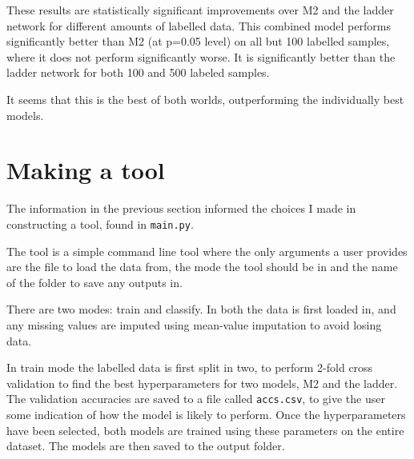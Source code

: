 These results are statistically significant improvements over M2 and the ladder network for different amounts of labelled data.
This combined model performs significantly better than M2 (at p=0.05 level) on all but 100 labelled samples, where it does not 
perform significantly worse. It is significantly better than the ladder network for both 100 and 500 labeled samples. 

It seems that this is the best of both worlds, outperforming the individually best models.

\section{Making a tool} \label{tool}

The information in the previous section informed the choices I made in constructing a tool, found in \texttt{main.py}.

The tool is a simple command line tool where the  only arguments a user provides are the file to load the data 
from, the mode the tool should be in and the name of the folder to save any outputs in.

There are two modes: train and classify. In both the data is first loaded in, and  any missing values are imputed using 
mean-value imputation to avoid losing data.

In train mode the labelled data is first split in two, to perform 2-fold cross validation to find the best hyperparameters for two 
models, M2 and the ladder. The validation accuracies are saved to a file called \texttt{accs.csv}, to give the user some indication of
how the model is likely to perform.
Once the hyperparameters have been selected, both models are trained using these parameters on the entire dataset. The models are then 
saved to the output folder.

